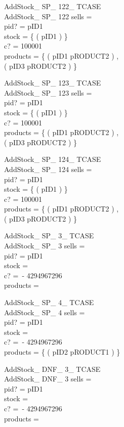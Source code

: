 \begin{schema}{AddStock\_ SP\_ 122\_ TCASE}\\
AddStock\_ SP\_ 122
\where
sells =~\emptyset \\
pid? = pID1 \\
stock = \{ ( pID1  ) \} \\
c? = 100001 \\
products = \{ ( pID1 \mapsto pRODUCT2 ) , \\ ( pID3 \mapsto pRODUCT2 ) \}
\end{schema}


\begin{schema}{AddStock\_ SP\_ 123\_ TCASE}\\
AddStock\_ SP\_ 123
\where
sells =~\emptyset \\
pid? = pID1 \\
stock = \{ ( pID1  ) \} \\
c? = 100001 \\
products = \{ ( pID1 \mapsto pRODUCT2 ) , \\ ( pID3 \mapsto pRODUCT2 ) \}
\end{schema}


\begin{schema}{AddStock\_ SP\_ 124\_ TCASE}\\
AddStock\_ SP\_ 124
\where
sells =~\emptyset \\
pid? = pID1 \\
stock = \{ ( pID1  ) \} \\
c? = 100001 \\
products = \{ ( pID1 \mapsto pRODUCT2 ) , \\ ( pID3 \mapsto pRODUCT2 ) \}
\end{schema}


\begin{schema}{AddStock\_ SP\_ 3\_ TCASE}\\
AddStock\_ SP\_ 3
\where
sells =~\emptyset \\
pid? = pID1 \\
stock =~\emptyset \\
c? =~- 4294967296 \\
products =~\emptyset
\end{schema}


\begin{schema}{AddStock\_ SP\_ 4\_ TCASE}\\
AddStock\_ SP\_ 4
\where
sells =~\emptyset \\
pid? = pID1 \\
stock =~\emptyset \\
c? =~- 4294967296 \\
products = \{ ( pID2 \mapsto pRODUCT1 ) \}
\end{schema}


\begin{schema}{AddStock\_ DNF\_ 3\_ TCASE}\\
AddStock\_ DNF\_ 3
\where
sells =~\emptyset \\
pid? = pID1 \\
stock =~\emptyset \\
c? =~- 4294967296 \\
products =~\emptyset
\end{schema}